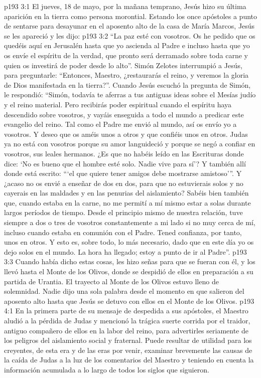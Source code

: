 \vs p193 3:1 El jueves, 18 de mayo, por la mañana temprano, Jesús hizo su última aparición en la tierra como persona morontial. Estando los once apóstoles a punto de sentarse para desayunar en el aposento alto de la casa de María Marcos, Jesús se les apareció y les dijo:
\vs p193 3:2 \pc “La paz esté con vosotros. Os he pedido que os quedéis aquí en Jerusalén hasta que yo ascienda al Padre e incluso hasta que yo os envíe el espíritu de la verdad, que pronto será derramado sobre toda carne y quien os investirá de poder desde lo alto”. Simón Zelotes interrumpió a Jesús, para preguntarle: “Entonces, Maestro, ¿restaurarás el reino, y veremos la gloria de Dios manifestada en la tierra?”. Cuando Jesús escuchó la pregunta de Simón, le respondió: “Simón, todavía te aferras a tus antiguas ideas sobre el Mesías judío y el reino material. Pero recibirás poder espiritual cuando el espíritu haya descendido sobre vosotros, y vayáis enseguida a todo el mundo a predicar este evangelio del reino. Tal como el Padre me envió al mundo, así os envío yo a vosotros. Y deseo que os améis unos a otros y que confiéis unos en otros. Judas ya no está con vosotros porque su amor languideció y porque se negó a confiar en vosotros, sus leales hermanos. ¿Es que no habéis leído en las Escrituras donde dice: ‘No es bueno que el hombre esté solo. Nadie vive para sí’? Y también allí donde está escrito: “‘el que quiere tener amigos debe mostrarse amistoso’”. Y ¿acaso no os envié a enseñar de dos en dos, para que no estuvierais solos y no cayerais en las maldades y en las penurias del aislamiento? Sabéis bien también que, cuando estaba en la carne, no me permití a mí mismo estar a solas durante largos períodos de tiempo. Desde el principio mismo de nuestra relación, tuve siempre a dos o tres de vosotros constantemente a mi lado si no muy cerca de mí, incluso cuando estaba en comunión con el Padre. Tened confianza, por tanto, unos en otros. Y esto es, sobre todo, lo más necesario, dado que en este día yo os dejo solos en el mundo. La hora ha llegado; estoy a punto de ir al Padre”.
\vs p193 3:3 \pc Cuando había dicho estas cosas, les hizo señas para que se fueran con él, y los llevó hasta el Monte de los Olivos, donde se despidió de ellos en preparación a su partida de Urantia. El trayecto al Monte de los Olivos estuvo lleno de solemnidad. Nadie dijo una sola palabra desde el momento en que salieron del aposento alto hasta que Jesús se detuvo con ellos en el Monte de los Olivos.
\vs p193 4:1 En la primera parte de su mensaje de despedida a sus apóstoles, el Maestro aludió a la pérdida de Judas y mencionó la trágica suerte corrida por el traidor, antiguo compañero de ellos en la labor del reino, para advertirles seriamente de los peligros del aislamiento social y fraternal. Puede resultar de utilidad para los creyentes, de esta era y de las eras por venir, examinar brevemente las causas de la caída de Judas a la luz de los comentarios del Maestro y teniendo en cuenta la información acumulada a lo largo de todos los siglos que siguieron.
